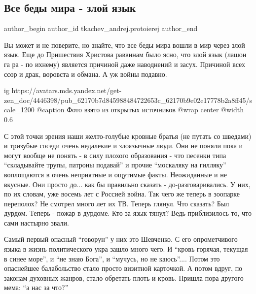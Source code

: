  
 
 
 
 
 
\subsection{Все беды мира - злой язык}
\label{sec:24_02_2022.yz.tkachev_andrej.protoierej.1.vse_bedy_mira_zloj_jazyk}
 
\ifcmt
 author_begin
   author_id tkachev_andrej.protoierej
 author_end
\fi

Вы может и не поверите, но знайте, что все беды мира вошли в мир через злой
язык. Еще до Пришествия Христова раввинам было ясно, что злой язык (лашон га ра
- по ихнему) является причиной даже наводнений и засух. Причиной всех ссор и
драк, воровста и обмана. А уж войны подавно. 

\ifcmt
  ig https://avatars.mds.yandex.net/get-zen_doc/4446398/pub_62170b7d845988484722653c_62170b9e02e17778b2a8ff45/scale_1200
  @caption Фото взято из открытых источников
	@wrap center
	@width 0.6
\fi

С этой точки зрения наши желто-голубые кровные братья (не путать со шведами) и
тризубые соседи очень недалекие и злоязычные люди. Они не поняли пока и могут
вообще не понять - в силу плохого образования - что песенки типа
\enquote{складывайте трупы, патроны подавай} и прочие \enquote{москаляку на
гилляку} воплощаются в очень неприятные и ощутимые факты. Неожиданные и не
вкусные. Они просто до... как бы правильно сказать - до-разговаривались. У них,
по их словам, уже восемь лет с Россией война. Так чего же теперь в зоопарке
переполох? Не смотрел много лет их ТВ. Теперь глянул. Что сказать? Был дурдом.
Теперь - пожар в дурдоме. Кто за язык тянул? Ведь приблизилось то, что сами
настырно звали. 

Самый первый опасный \enquote{говорун} у них это Шевченко. С его опрометчивого языка в
жизнь политического укра зашло много чего. И \enquote{кровь горячая, текущая в синее
море}, и \enquote{не знаю Бога}, и \enquote{мучусь, но не каюсь}.... Потом это опаснейшее
балабольство стало просто визитной карточкой. А потом вдруг, по законам
духовных жанров, стало обретать плоть и кровь. Пришла пора другого мема: \enquote{а нас
за что?}

